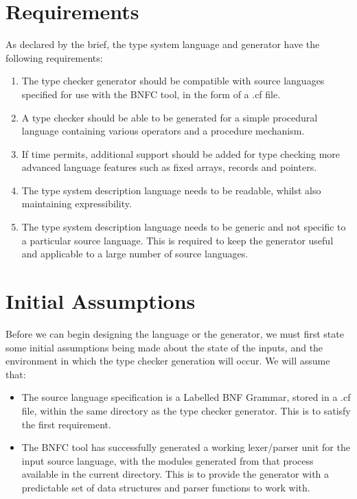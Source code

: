\documentclass{UoYCSproject}
\begin{document}
\section{Requirements}
\label{sec:Requirements}
As declared by the brief, the type system language and generator have the
following requirements:
\begin{enumerate}
    \item The type checker generator should be compatible with source languages
        specified for use with the BNFC tool, in the form of a {\ttfamily .cf}
        file.
    \item A type checker should be able to be generated for a simple procedural 
        language containing various operators and a procedure mechanism.
    \item If time permits, additional support should be added for type checking
        more advanced language features such as fixed arrays, records and 
        pointers.
    \item The type system description language needs to be readable, whilst
        also maintaining expressibility.
    \item The type system description language needs to be generic and not
        specific to a particular source language. This is required to keep
        the generator useful and applicable to a large number of source languages.
\end{enumerate}

\section{Initial Assumptions}
Before we can begin designing the language or the generator, we must first state 
some initial assumptions being made about the state of the inputs, and the 
environment in which the type checker generation will occur. We will assume that:
\begin{itemize}
    \item The source language specification is a Labelled BNF Grammar, stored 
        in a {\ttfamily .cf} file, within the same directory as the type
        checker generator. This is to satisfy the first requirement.
    \item The BNFC tool has successfully generated a working lexer/parser unit
        for the input source language, with the modules generated from that
        process available in the current directory. This is to provide the
        generator with a predictable set of data structures and parser functions 
        to work with.
\end{itemize}
\end{document}
